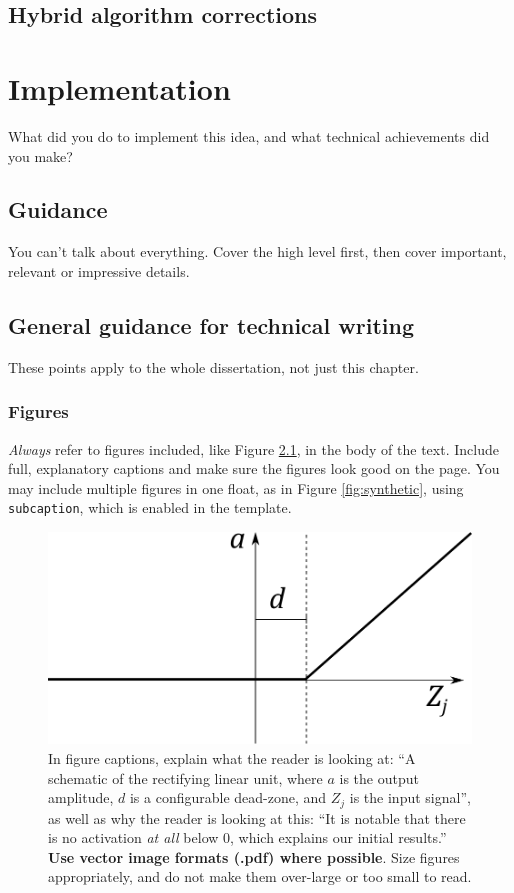 \documentclass{l4proj}
\begin{document}
\section{Hybrid algorithm corrections}









\chapter{Implementation}
What did you do to implement this idea, and what technical achievements did you make?
\section{Guidance}
You can't talk about everything. Cover the high level first, then cover important, relevant or impressive details.

\section{General guidance for technical writing}

These points apply to the whole dissertation, not just this chapter.

\subsection{Figures}
\emph{Always} refer to figures included, like Figure \ref{fig:relu}, in the body of the text. Include full, explanatory captions and make sure the figures look good on the page.
You may include multiple figures in one float, as in Figure \ref{fig:synthetic}, using \texttt{subcaption}, which is enabled in the template.


\begin{figure}[htb]
    \centering
    \includegraphics[width=0.5\linewidth]{images/relu.pdf}    

    \caption{In figure captions, explain what the reader is looking at: ``A schematic of the rectifying linear unit, where $a$ is the output amplitude,
    $d$ is a configurable dead-zone, and $Z_j$ is the input signal'', as well as why the reader is looking at this: 
    ``It is notable that there is no activation \emph{at all} below 0, which explains our initial results.'' 
    \textbf{Use vector image formats (.pdf) where possible}. Size figures appropriately, and do not make them over-large or too small to read.
    }

    \label{fig:relu} 
\end{figure}
\end{document}
